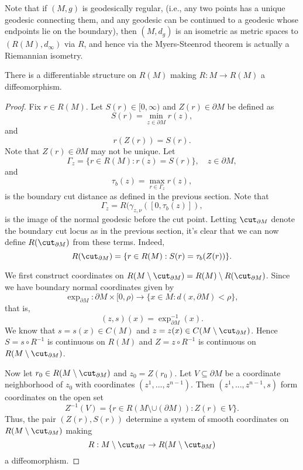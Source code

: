\begin{remark}
	Note that if $(M,g)$ is geodesically regular, (i.e., any two points has a unique geodesic connecting them, and any geodesic can be continued to a geodesic whose endpoints lie on the boundary), then $(M,d_g)$ is an isometric as metric spaces to $(R(M),d_\infty)$ via $R$, and hence via the Myers-Steenrod theorem is actually a Riemannian isometry.
\end{remark}

\begin{prop}
    There is a differentiable structure on $R(M)$ making $R:M\to R(M)$ a diffeomorphism.
\end{prop}

\begin{proof}
Fix $r\in R(M)$.  Let $S(r)\in[0,\infty)$ and $Z(r)\in \partial M$ be defined as
$$S(r)=\min_{z\in\partial M}r(z),$$
and
$$r(Z(r))=S(r).$$
Note that $Z(r)\in\partial M$ may not be unique.  Let
$$\Gamma_z=\{r\in R(M):r(z)=S(r)\},\quad z\in\partial M,$$
and
$$\tau_b(z)=\max_{r\in\Gamma_z}r(z),$$
is the boundary cut distance as defined in the previous section.  Note that
$$\Gamma_z=R(\gamma_{z,\nu}([0,\tau_b(z)]),$$
is the image of the normal geodesic before the cut point.  Letting $\cut_{\partial M}$ denote the boundary cut locus as in the previous section, it's clear that we can now define $R(\cut_{\partial M})$ from these terms.  Indeed,
$$R(\cut_{\partial M})=\{r\in R(M):S(r)=\tau_b(Z(r))\}.$$

We first construct coordinates on $R(M\setminus\cut_{\partial M})=R(M)\setminus R(\cut_{\partial M})$.  Since we have boundary normal coordinates given by
$$\exp_{\partial M}:\partial M\times[0,\rho)\to \{x\in M:d(x,\partial M)<\rho\},$$
that is,
$$(z,s)(x)=\exp_{\partial M}^{-1}(x).$$
We know that $s=s(x)\in C(M)$ and $z=z(x)\in C(M\setminus\cut_{\partial M})$.  Hence $S=s\circ R^{-1}$ is continuous on $R(M)$ and $Z=z\circ R^{-1}$ is continuous on $R(M\setminus\cut_{\partial M})$.

Now let $r_0\in R(M\setminus\cut_{\partial M})$ and $z_0=Z(r_0)$. Let $V\subseteq\partial M$ be a coordinate neighborhood of $z_0$ with coordinates $(z^1,...,z^{n-1})$.  Then $(z^1,...,z^{n-1},s)$ form coordinates on the open set
$$Z^{-1}(V)=\{r\in R(M\setminus\cup(\partial M)):Z(r)\in V\}.$$
Thus, the pair $(Z(r),S(r))$ determine a system of smooth coordinates on $R(M\setminus\cut_{\partial M})$ making
$$R:M\setminus\cut_{\partial M}\to R(M\setminus\cut_{\partial M})$$
a diffeomorphism.


\end{proof}

